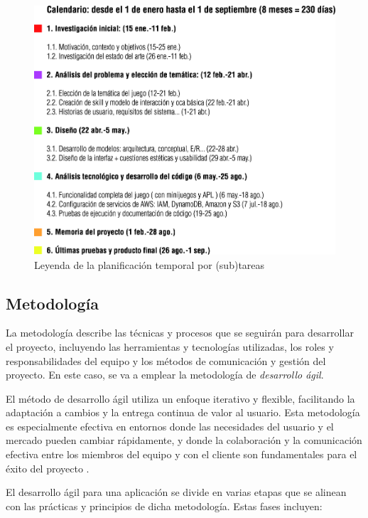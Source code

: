 \begin{figure}[H]
	\centering
	\includegraphics[width=1\textwidth]{imgs/tabla-planning2.jpg}
	\caption{Leyenda de la planificación temporal por (sub)tareas}
	\label{fig:planning2}
\end{figure}

\newpage

\subsection{Metodología}

La metodología describe las técnicas y procesos que se seguirán para desarrollar el proyecto, incluyendo las herramientas y tecnologías utilizadas, los roles y responsabilidades del equipo y los métodos de comunicación y gestión del proyecto. En este caso, se va a emplear la metodología de \textit{desarrollo ágil}.

El método de desarrollo ágil utiliza un enfoque iterativo y flexible, facilitando la adaptación a cambios y la entrega continua de valor al usuario. Esta metodología es especialmente efectiva en entornos donde las necesidades del usuario y el mercado pueden cambiar rápidamente, y donde la colaboración y la comunicación efectiva entre los miembros del equipo y con el cliente son fundamentales para el éxito del proyecto \parencite{metodologiaAgil}.

El desarrollo ágil para una aplicación se divide en varias etapas que se alinean con las prácticas y principios de dicha metodología. Estas fases incluyen:

